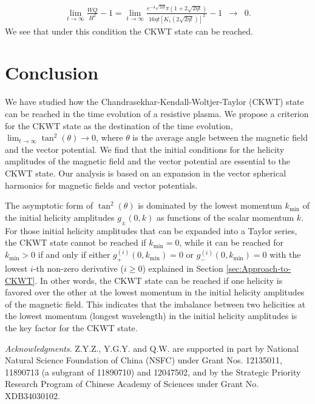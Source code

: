 \documentclass[english,aps,superscriptaddress,preprint]{revtex4-1}
\begin{document}
\begin{eqnarray}
\lim_{t\rightarrow\infty}\frac{WQ}{H^{2}}-1=\lim_{t\rightarrow\infty}\frac{e^{-4\sqrt{2\eta t}}\pi\left(1+2\sqrt{2\eta t}\right)}{16\eta t\left[K_{1}(2\sqrt{2\eta t})\right]^{2}}-1 & \rightarrow & 0.
\end{eqnarray}
We see that under this condition the CKWT state can be reached.

\section{Conclusion}

We have studied how the Chandrasekhar-Kendall-Woltjer-Taylor (CKWT)
state can be reached in the time evolution of a resistive plasma.
We propose a criterion for the CKWT state as the destination of the
time evolution, $\lim_{t\rightarrow\infty}\tan^{2}(\theta)\rightarrow0$,
where $\theta$ is the average angle between the magnetic field and
the vector potential. We find that the initial conditions for the
helicity amplitudes of the magnetic field and the vector potential
are essential to the CKWT state. Our analysis is based on an expansion
in the vector spherical harmonics for magnetic fields and vector potentials.

The asymptotic form of $\tan^{2}(\theta)$ is dominated by the lowest
momentum $k_{\mathrm{min}}$ of the initial helicity amplitudes $g_{\pm}(0,k)$
as functions of the scalar momentum $k$. For those initial helicity
amplitudes that can be expanded into a Taylor series, the CKWT state
cannot be reached if $k_{\mathrm{min}}=0$, while it can be reached
for $k_{\mathrm{min}}>0$ if and only if either $g_{+}^{(i)}(0,k_{\mathrm{min}})=0$
or $g_{-}^{(i)}(0,k_{\mathrm{min}})=0$ with the lowest $i$-th non-zero
derivative ($i\geq0$) explained in Section \ref{sec:Approach-to-CKWT}.
In other words, the CKWT state can be reached if one helicity is favored
over the other at the lowest momentum in the initial helicity amplitudes
of the magnetic field. This indicates that the imbalance between two
helicities at the lowest momentum (longest wavelength) in the initial
helicity amplitudes is the key factor for the CKWT state.


\textit{Acknowledgments}. Z.Y.Z., Y.G.Y. and Q.W. are supported in
part by National Natural Science Foundation of China (NSFC) under
Grant Nos. 12135011, 11890713 (a subgrant of 11890710) and 12047502,
and by the Strategic Priority Research Program of Chinese Academy
of Sciences under Grant No. XDB34030102.
\end{document}
